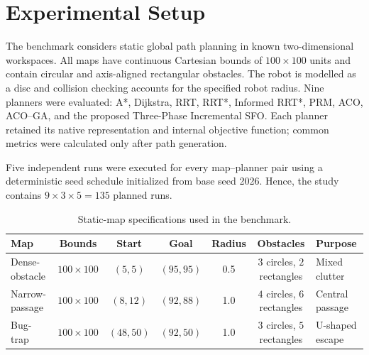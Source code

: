 \section{Experimental Setup}
\label{sec:experimental-setup}

The benchmark considers static global path planning in known two-dimensional
workspaces. All maps have continuous Cartesian bounds of $100\times100$ units
and contain circular and axis-aligned rectangular obstacles. The robot is
modelled as a disc and collision checking accounts for the specified robot
radius. Nine planners were evaluated: A*, Dijkstra, RRT, RRT*, Informed RRT*,
PRM, ACO, ACO--GA, and the proposed Three-Phase Incremental SFO. Each planner
retained its native representation and internal objective function; common
metrics were calculated only after path generation.

Five independent runs were executed for every map--planner pair using a
deterministic seed schedule initialized from base seed 2026. Hence, the study
contains $9\times3\times5=135$ planned runs.

\begin{table}[t]
\centering
\caption{Static-map specifications used in the benchmark.}
\label{tab:map-specifications}
\begin{tabular}{lcccccl}
\toprule
Map & Bounds & Start & Goal & Radius & Obstacles & Purpose \\
\midrule
Dense-obstacle & $100\times100$ & $(5,5)$ & $(95,95)$ & 0.5 & $3$ circles, $2$ rectangles & Mixed clutter \\
Narrow-passage & $100\times100$ & $(8,12)$ & $(92,88)$ & 1.0 & $4$ circles, $6$ rectangles & Central passage \\
Bug-trap & $100\times100$ & $(48,50)$ & $(92,50)$ & 1.0 & $3$ circles, $5$ rectangles & U-shaped escape \\
\bottomrule
\end{tabular}
\end{table}

